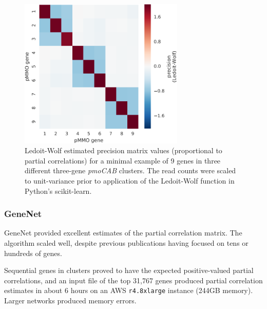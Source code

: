 \begin{figure}[H]
\centering
    \includegraphics[width=0.7\textwidth]{./tex/chapter3/figures/17045_LedoitWolf_results_on_9_pmo_genes--uncentered.pdf}
    \begin{singlespace}
    \caption[Partial correlation demo: three \textit{pmoCAB} clusters]{
        Ledoit-Wolf estimated precision matrix values (proportional to partial correlations) for a minimal example of 9 genes in three different three-gene \textit{pmoCAB} clusters.
        The read counts were scaled to unit-variance prior to application of the Ledoit-Wolf function in Python's scikit-learn.
        }
    \label{fig:pcor_pmocab}
    \end{singlespace}
\end{figure}


\subsubsection{GeneNet}
GeneNet provided excellent estimates of the partial correlation matrix.
The algorithm scaled well, despite previous publications having focused on tens or hundreds of genes.

Sequential genes in clusters proved to have the expected positive-valued partial correlations, and an input file of the top 31,767 genes produced partial correlation estimates in about 6 hours on an AWS \texttt{r4.8xlarge} instance (244GB memory).
Larger networks produced memory errors.

